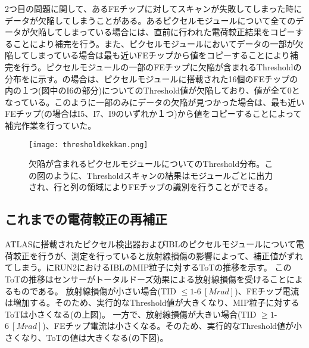 2つ目の問題に関して、あるFEチップに対してスキャンが失敗してしまった時にデータが欠陥してしまうことがある。あるピクセルモジュールについて全てのデータが欠陥してしまっている場合には、直前に行われた電荷較正結果をコピーすることにより補完を行う。また、ピクセルモジュールにおいてデータの一部が欠陥してしまっている場合は最も近いFEチップから値をコピーすることにより補完を行う。ピクセルモジュールの一部のFEチップに欠陥が含まれるThresholdの分布をに示す。の場合は、ピクセルモジュールに搭載された16個のFEチップの内の１つ(図中のI6の部分)についてのThreshold値が欠陥しており、値が全て0となっている。このように一部のみにデータの欠陥が見つかった場合は、最も近いFEチップ(の場合はI5、I7、I9のいずれか１つ)から値をコピーすることによって補完作業を行っていた。

\begin{figure}[tbp]
  \centering
  \texttt{[image: thresholdkekkan.png]}
  \caption[欠陥が含まれるピクセルモジュールについてのThreshold分布]{欠陥が含まれるピクセルモジュールについてのThreshold分布。この図のように、Thresholdスキャンの結果はモジュールごとに出力され、行と列の領域によりFEチップの識別を行うことができる。}
  \label{fig:thresholdkekkan}
\end{figure}

\subsection{これまでの電荷較正の再補正}
\label{sec:prehosei}

ATLASに搭載されたピクセル検出器およびIBLのピクセルモジュールについて電荷較正を行うが、測定を行っていると放射線損傷の影響によって、補正値がずれてしまう。にRUN2におけるIBLのMIP粒子に対するToTの推移を示す。
このToTの推移はセンサーがトータルドーズ効果による放射線損傷を受けることによるものである。
放射線損傷が小さい場合(TID $\leq1$-$6\ [\si{Mrad}]$)、FEチップ電流は増加する。そのため、実行的なThreshold値が大きくなり、MIP粒子に対するToTは小さくなる(の上図)。
一方で、放射線損傷が大きい場合(TID $\geq1$-$6\ [\si{Mrad}]$)、FEチップ電流は小さくなる。そのため、実行的なThreshold値が小さくなり、ToTの値は大きくなる(の下図)。

